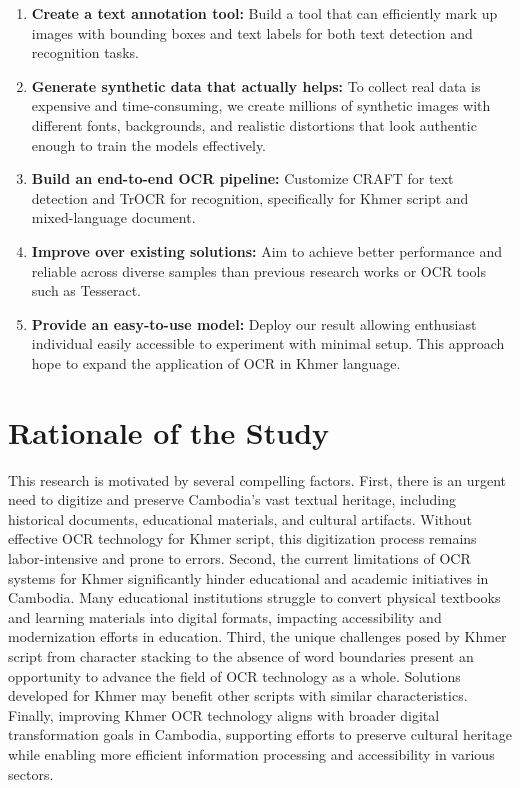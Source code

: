 {\begin{enumerate}
    \item \textbf{Create a text annotation tool:} Build a tool that can efficiently mark up images with bounding boxes and text labels for both text detection and recognition tasks.

    \item \textbf{Generate synthetic data that actually helps:} To collect real data is expensive and time-consuming, we create millions of synthetic images with different fonts, backgrounds, and realistic distortions that look authentic enough to train the models effectively.

    \item \textbf{Build an end-to-end OCR pipeline:} Customize CRAFT for text detection and TrOCR for recognition, specifically for Khmer script and mixed-language document.

    \item \textbf{Improve over existing solutions:} Aim to achieve better performance and reliable across diverse samples than previous research works or OCR tools such as Tesseract.
    
    \item \textbf{Provide an easy-to-use model:} Deploy our result allowing enthusiast individual easily accessible to experiment with minimal setup. This approach hope to expand the application of OCR in Khmer language.
\end{enumerate}


\section{Rationale of the Study}
\label{sec:rationale}
       This research is motivated by several compelling factors. First, there is an urgent need to digitize and preserve Cambodia's vast textual heritage, including historical documents, educational materials, and cultural artifacts. Without effective OCR technology for Khmer script, this digitization process remains labor-intensive and prone to errors.
       Second, the current limitations of OCR systems for Khmer significantly hinder educational and academic initiatives in Cambodia. Many educational institutions struggle to convert physical textbooks and learning materials into digital formats, impacting accessibility and modernization efforts in education.
       Third, the unique challenges posed by Khmer script from character stacking to the absence of word boundaries present an opportunity to advance the field of OCR technology as a whole. Solutions developed for Khmer may benefit other scripts with similar characteristics.
       Finally, improving Khmer OCR technology aligns with broader digital transformation goals in Cambodia, supporting efforts to preserve cultural heritage while enabling more efficient information processing and accessibility in various sectors.

}
